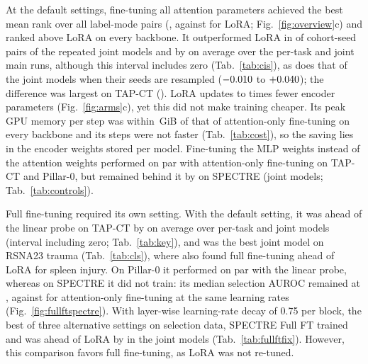 At the default settings, fine-tuning all attention parameters achieved the best mean rank over all label-mode pairs (\numRankAttnftMean{}, against \numRankLoraMean{} for LoRA; Fig.~\ref{fig:overview}c) and ranked above LoRA on every backbone. It outperformed LoRA in \numSeedsclsAttnftLoraAllPosN{} of \numSeedsclsAttnftLoraAllPairsN{} cohort-seed pairs of the repeated joint models and by \magn{\numCiClsattnftloraAllMeandiff} on average over the per-task and joint main runs, although this interval includes zero (Tab.~\ref{tab:cis}), as does that of the joint models when their seeds are resampled ($-0.010$ to $+0.040$); the difference was largest on TAP-CT (\magn{\numCiClsattnftloraTapctMeandiff}). LoRA updates \numParamsratioPillarZAttnftLora{} to \numParamsratioSpectreAttnftLora{} times fewer encoder parameters (Fig.~\ref{fig:arms}c), yet this did not make training cheaper. Its peak GPU memory per step was within \numCostClsLoraAttnftMaxGibdiff{}\,GiB of that of attention-only fine-tuning on every backbone and its steps were not faster (Tab.~\ref{tab:cost}), so the saving lies in the encoder weights stored per model. Fine-tuning the MLP weights instead of the attention weights performed on par with attention-only fine-tuning on TAP-CT and Pillar-0, but remained behind it by \magn{\numCtrlSpectreMlpftAttnftMeandiff} on SPECTRE (joint models; Tab.~\ref{tab:controls}).

Full fine-tuning required its own setting. With the default setting, it was ahead of the linear probe on TAP-CT by \magn{\numCiClsfullftlinTapctMeandiff} on average over per-task and joint models (interval including zero; Tab.~\ref{tab:key}), and was the best joint model on RSNA23 trauma (Tab.~\ref{tab:cls}), where \citet{liu2025anymc3d} also found full fine-tuning ahead of LoRA for spleen injury. On Pillar-0 it performed on par with the linear probe, whereas on SPECTRE it did not train: its median selection AUROC remained at \numTrajSpectrefullftLast{}, against \numTrajSpectreattnftLast{} for attention-only fine-tuning at the same learning rates (Fig.~\ref{fig:fullftspectre}). With layer-wise learning-rate decay of 0.75 per block, the best of three alternative settings on selection data, SPECTRE Full FT trained and was ahead of LoRA by \magn{\numFixselSpectreLoraMeandiff} in the joint models (Tab.~\ref{tab:fullftfix}). However, this comparison favors full fine-tuning, as LoRA was not re-tuned.

